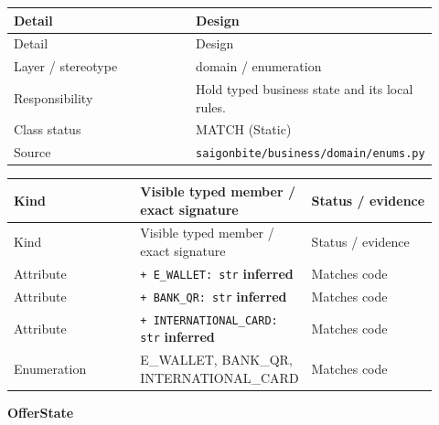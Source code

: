 \begin{longtable}{>{\raggedright\arraybackslash}p{0.4600\linewidth}>{\raggedright\arraybackslash}p{0.4600\linewidth}}
Detail & Design \\
\hline\endfirsthead
Detail & Design \\
\hline\endhead
Layer / stereotype & domain / \guillemotleft{}enumeration\guillemotright{} \\
Responsibility & Hold typed business state and its local rules. \\
Class status & MATCH (Static) \\
Source & \texttt{saigonbite/\allowbreak{}business/\allowbreak{}domain/\allowbreak{}enums.\allowbreak{}py} \\
\end{longtable}
\begin{longtable}{>{\raggedright\arraybackslash}p{0.3067\linewidth}>{\raggedright\arraybackslash}p{0.3067\linewidth}>{\raggedright\arraybackslash}p{0.3067\linewidth}}
Kind & Visible typed member / exact signature & Status / evidence \\
\hline\endfirsthead
Kind & Visible typed member / exact signature & Status / evidence \\
\hline\endhead
Attribute & \texttt{+ E\_\allowbreak{}WALLET: str} \textbf{inferred} & Matches code \\
Attribute & \texttt{+ BANK\_\allowbreak{}QR: str} \textbf{inferred} & Matches code \\
Attribute & \texttt{+ INTERNATIONAL\_\allowbreak{}CARD: str} \textbf{inferred} & Matches code \\
Enumeration & E\_WALLET, BANK\_QR, INTERNATIONAL\_CARD & Matches code \\
\end{longtable}
\textbf{OfferState}

